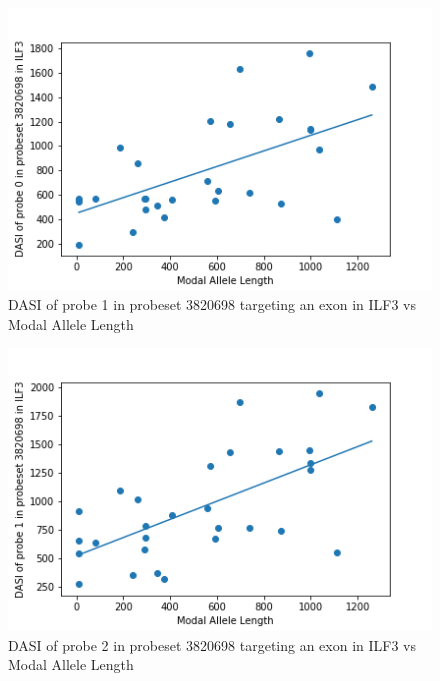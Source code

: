 \begin{figure}
	\centering
	\includegraphics[width=135mm]{probeILF30.png}
	\caption{DASI of probe 1 in probeset 3820698 targeting an exon in ILF3 vs Modal Allele Length}
    \label{probeILF30}
\end{figure}

\begin{figure}
	\centering
	\includegraphics[width=135mm]{probeILF31.png}
	\caption{DASI of probe 2 in probeset 3820698 targeting an exon in ILF3 vs Modal Allele Length}
    \label{probeILF31}
\end{figure}

